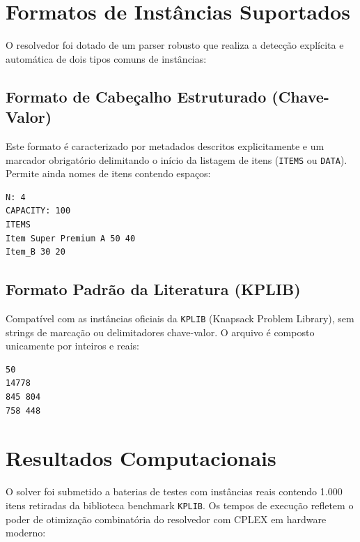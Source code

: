 \documentclass[12pt,a4paper]{article}
\begin{document}
\newpage
\section{Formatos de Instâncias Suportados}
O resolvedor foi dotado de um parser robusto que realiza a detecção explícita e automática de dois tipos comuns de instâncias:

\subsection{Formato de Cabeçalho Estruturado (Chave-Valor)}
Este formato é caracterizado por metadados descritos explicitamente e um marcador obrigatório delimitando o início da listagem de itens (\texttt{ITEMS} ou \texttt{DATA}). Permite ainda nomes de itens contendo espaços:
\begin{verbatim}
N: 4
CAPACITY: 100
ITEMS
Item Super Premium A 50 40
Item_B 30 20
\end{verbatim}

\subsection{Formato Padrão da Literatura (KPLIB)}
Compatível com as instâncias oficiais da \texttt{KPLIB} (Knapsack Problem Library), sem strings de marcação ou delimitadores chave-valor. O arquivo é composto unicamente por inteiros e reais:
\begin{verbatim}
50
14778
845 804
758 448
\end{verbatim}

\section{Resultados Computacionais}
O solver foi submetido a baterias de testes com instâncias reais contendo 1.000 itens retiradas da biblioteca benchmark \texttt{KPLIB}. Os tempos de execução refletem o poder de otimização combinatória do resolvedor com CPLEX em hardware moderno:
\end{document}
